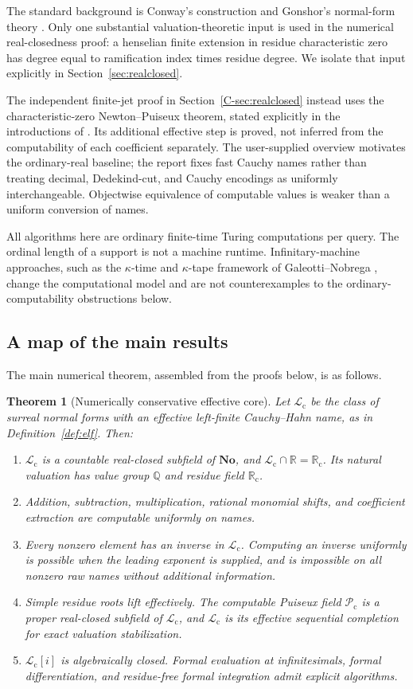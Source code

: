 \documentclass[11pt,letterpaper]{article}
\numberwithin{equation}{section}
\newtheorem{theorem}{Theorem}[section]
\theoremstyle{definition}
\theoremstyle{remark}
\newcommand{\No}{\mathbf{No}}
\newcommand{\Rc}{\mathbb R_{\mathrm c}}
\newcommand{\Lc}{\mathcal L_{\mathrm c}}
\newcommand{\Pc}{\mathcal P_{\mathrm c}}
\newcommand{\Q}{\mathbb Q}
\newcommand{\R}{\mathbb R}
\begin{document}
The standard background is Conway's construction and Gonshor's normal-form
theory \cite{conway,gonshor}. Only one substantial valuation-theoretic input
is used in the numerical real-closedness proof: a henselian finite extension
in residue characteristic zero has degree equal to ramification index times
residue degree. We isolate that input explicitly in
Section~\ref{sec:realclosed}.


The independent finite-jet proof in Section~\ref{C-sec:realclosed} instead uses
the characteristic-zero Newton--Puiseux theorem, stated explicitly in the
introductions of \cite{rond,kedlaya}. Its additional effective step is proved,
not inferred from the computability of each coefficient separately. The
user-supplied overview \cite{wiki} motivates the ordinary-real baseline;
the report fixes fast Cauchy names rather than treating decimal, Dedekind-cut,
and Cauchy encodings as uniformly interchangeable. Objectwise equivalence
of computable values is weaker than a uniform conversion of names.

All algorithms here are ordinary finite-time Turing computations per query.
The ordinal length of a support is not a machine runtime. Infinitary-machine
approaches, such as the $\kappa$-time and $\kappa$-tape framework of
Galeotti--Nobrega \cite{galeotti}, change the computational model and are
not counterexamples to the ordinary-computability obstructions below.

\subsection{A map of the main results}

The main numerical theorem, assembled from the proofs below, is as follows.

\begin{theorem}[Numerically conservative effective core]
\label{thm:main}
Let $\Lc$ be the class of surreal normal forms with an effective left-finite
Cauchy--Hahn name, as in Definition~\ref{def:elf}. Then:
\begin{enumerate}[label=\textup{(\roman*)},leftmargin=2em]
\item $\Lc$ is a countable real-closed subfield of $\No$, and
$\Lc\cap\R=\Rc$. Its natural valuation has value group $\Q$ and residue
field $\Rc$.
\item Addition, subtraction, multiplication, rational monomial shifts,
and coefficient extraction are computable uniformly on names.
\item Every nonzero element has an inverse in $\Lc$. Computing an inverse
uniformly is possible when the leading exponent is supplied, and is
impossible on all nonzero raw names without additional information.
\item Simple residue roots lift effectively. The computable Puiseux field
$\Pc$ is a proper real-closed subfield of $\Lc$, and $\Lc$ is its effective
sequential completion for exact valuation stabilization.
\item $\Lc[i]$ is algebraically closed. Formal evaluation at infinitesimals,
formal differentiation, and residue-free formal integration admit explicit
algorithms.
\end{enumerate}
\end{theorem}
\end{document}
